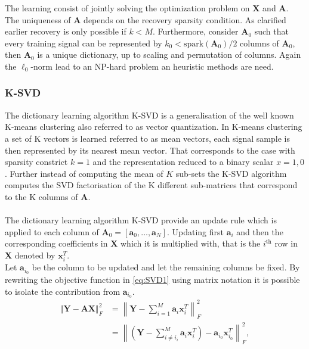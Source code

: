 The learning consist of jointly solving the optimization problem on $\textbf{X}$ and $\textbf{A}$. The uniqueness of $\textbf{A}$ depends on the recovery sparsity condition. As clarified earlier recovery is only possible if $k < M$\cite{phd2015}. Furthermore, consider $\textbf{A}_0$ such that every training signal can be represented by $k_0 < \text{spark}(\textbf{A}_0)/2$ columns of $\textbf{A}_0$, then $\textbf{A}_0$ is a unique dictionary, up to scaling and permutation of columns\cite{Elad_book}. Again the $\ell_0$-norm lead to an NP-hard problem an heuristic methods are need.     

\subsubsection{K-SVD}
The dictionary learning algorithm K-SVD is a generalisation of the well known K-means clustering also referred to as vector quantization. In K-means clustering a set of K vectors is learned referred to as mean vectors, each signal sample is then represented by its nearest mean vector. That corresponds to the case with sparsity constrict $k=1$ and the representation reduced to a binary scalar $x={1,0}$. Further instead of computing the mean of $K$ sub-sets the K-SVD algorithm computes the SVD factorisation of the K different sub-matrices that correspond to the K columns of $\textbf{A}$.\\
\\
The dictionary learning algorithm K-SVD provide an update rule which is applied to each column of $\textbf{A}_0 = \left[ \textbf{a}_0, \hdots , \textbf{a}_N \right] $. Updating first $\textbf{a}_i$ and then the corresponding coefficients in $\textbf{X}$ which it is multiplied with, that is the $i^{\text{th}}$ row in $\textbf{X}$ denoted by $\textbf{x}_i^T$.\\
Let $\textbf{a}_{i_{0}}$ be the column to be updated and let the remaining columns be fixed. By rewriting the objective function in \eqref{eq:SVD1} using matrix notation it is possible to isolate the contribution from $\textbf{a}_{i_{0}}$.
\begin{align}
\Vert \textbf{Y} - \textbf{AX} \Vert_{F}^{2} 
&= \left\| \textbf{Y} - \sum_{i=1}^{M} \textbf{a}_i \textbf{x}_i^{T} \right\|_{F}^{2}\nonumber\\
&= \left\| \left( \textbf{Y}- \sum_{i\neq i_{i}}^{M} \textbf{a}_i\textbf{x}_i^{T}\right) - \textbf{a}_{i_{0}}\textbf{x}_{i_{0}}^{T} \right\| _{F}^{2},\label{eq:SVD2} 
\end{align}
